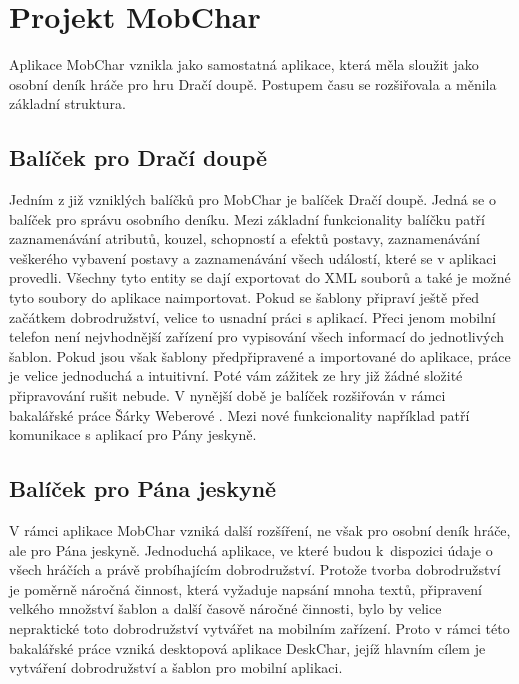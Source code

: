 \documentclass[thesis=B,czech]{resources/FITthesis}[2012/06/26]
\begin{document}
\section{Projekt MobChar}	
Aplikace MobChar vznikla jako samostatná aplikace, která měla sloužit jako osobní deník hráče pro hru Dračí doupě. Postupem času se rozšiřovala a měnila základní struktura. 

\subsection{Balíček pro Dračí doupě}
Jedním z již vzniklých balíčků pro MobChar je balíček Dračí doupě. Jedná se o balíček pro správu  osobního deníku. Mezi základní funkcionality balíčku patří zaznamenávání atributů, kouzel, schopností a efektů postavy, zaznamenávání veškerého vybavení postavy a zaznamenávání všech událostí, které se v aplikaci provedli. Všechny tyto entity se dají exportovat do XML souborů a také je možné tyto soubory do aplikace naimportovat. Pokud se šablony připraví ještě před začátkem dobrodružství, velice to usnadní práci s aplikací. Přeci jenom mobilní telefon není nejvhodnější zařízení pro vypisování všech informací do jednotlivých šablon. Pokud jsou však šablony předpřipravené a importované do aplikace, práce je velice jednoduchá a intuitivní. Poté vám zážitek ze hry již žádné složité připravování rušit nebude. V nynější době je balíček rozšiřován v rámci bakalářské práce Šárky Weberové \cite{Weberova_2017}. Mezi nové funkcionality například patří komunikace s aplikací pro Pány jeskyně.

\subsection{Balíček pro Pána jeskyně}
V rámci aplikace MobChar vzniká další rozšíření, ne však pro osobní deník hráče, ale pro Pána jeskyně. Jednoduchá aplikace, ve které budou k~dispozici údaje o všech hráčích a právě probíhajícím dobrodružství. Protože tvorba dobrodružství je poměrně náročná činnost, která vyžaduje napsání mnoha textů, připravení velkého množství šablon a další časově náročné činnosti, bylo by velice nepraktické toto dobrodružství vytvářet na mobilním zařízení. Proto v rámci této bakalářské práce vzniká desktopová aplikace DeskChar, jejíž hlavním cílem je vytváření dobrodružství a šablon pro mobilní aplikaci.
\end{document}
